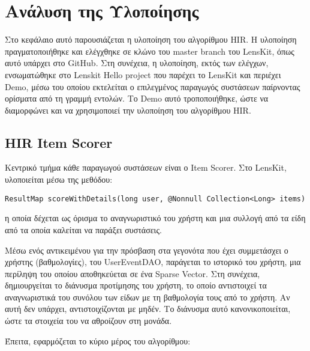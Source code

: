 \chapter{\el Ανάλυση της Υλοποίησης}
\label{Chapter5}
Στο κεφάλαιο αυτό παρουσιάζεται η υλοποίηση του αλγορίθμου {\en HIR}. Η υλοποί\-ηση πραγματοποιήθηκε και ελέγχθηκε σε κλώνο του {\en master branch} του {\en LensKit}, όπως αυτό υπάρχει στο {\en GitHub}. Στη συνέχεια, η υλοποίηση, εκτός των ελέγχων, ενσωματώθηκε στο {\en Lenskit Hello project} που παρέχει το {\en LensKit} και περιέχει {\en Demo}, μέσω του οποίου εκτελείται ο επιλεγμένος παραγωγός συστάσεων παίρνοντας ορίσματα από τη γραμμή εντολών. Το {\en Demo} αυτό τροποποιήθηκε, ώστε να διαμορφώνει και να χρησιμοποιεί την υλοποίηση του αλγορίθμου {\en HIR}.
\section{\en HIR Item Scorer}
Κεντρικό τμήμα κάθε παραγωγού συστάσεων είναι ο \en Item Scorer. \el Στο \en LensKit, \el υλοποιείται μέσω της μεθόδου:
\en \begin{footnotesize}
\begin{verbatim}
ResultMap scoreWithDetails(long user, @Nonnull Collection<Long> items)
\end{verbatim}
\end{footnotesize}
\el η οποία δέχεται ως όρισμα το αναγνωριστικό του χρήστη και μια συλλογή από τα είδη από τα οποία καλείται να παράξει συστάσεις. \par
Μέσω ενός αντικειμένου για την πρόσβαση στα γεγονότα που έχει συμμετάσχει ο χρήστης (βαθμολογίες), του \en UserEventDAO, \el παράγεται το ιστορικό του χρήστη, μια περίληψη του οποίου αποθηκεύεται σε ένα \en Sparse Vector. \el Στη συνέχεια, δημιουργείται το διάνυσμα προτίμησης του χρήστη, το οποίο αντιστοιχεί τα αναγνωριστικά του συνόλου των είδων με τη βαθμολογία τους από το χρήστη. Αν αυτή δεν υπάρχει, αντιστοιχίζονται με μηδέν. Το διάνυσμα αυτό κανονικοποιείται, ώστε τα στοιχεία του να αθροίζουν στη μονάδα. \par
Έπειτα, εφαρμόζεται το κύριο μέρος του αλγορίθμου:

